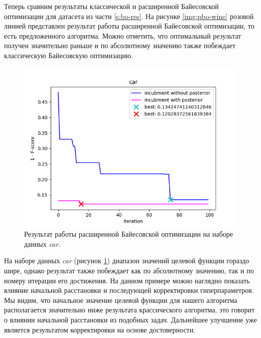 \documentclass[times,specification,annotation]{itmo-student-thesis}
\begin{document}
	Теперь сравним результаты классической и расширенной Байесовской оптимизации для датасета из части \ref{s:bo-res}. 
	На рисунке \ref{img:pbo-wine} розовой линией представлен результат работы расширенной Байесовской оптимизации, то есть предложенного алгоритма. Можно отметить, что оптимальный результат получен значительно раньше и по абсолютному значению также побеждает классическую Байесовскую оптимизацию. 
	\begin{figure}[!ht]
		\caption{Результат работы расширенной Байесовской оптимизации на наборе данных \textit{car}.}\label{img:pbo-car}
		\includegraphics[width=0.85\linewidth]{../png/incubment-iteration-posterior/car}
		\centering
	\end{figure}
	На наборе данных \textit{car} (рисунок \ref{img:pbo-car}) диапазон значений целевой функции гораздо шире, однако результат также побеждает как по абсолютному значению, так и по номеру итерации его достижения. На данном примере можно наглядно показать влияние начальной расстановки и последующей корректировки гиперпараметров. Мы видим, что начальное значение целевой функции для нашего алгоритма располагается значительно ниже результата крассического алгоритма, это говорит о влиянии начальной расстановки из подобных задач. Дальнейшее улучшение уже является результатом корректировки на основе достоверности. \par 
	
\end{document}
